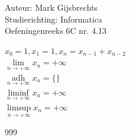 \documentclass[a4paper]{article}
\newcommand{\adh}{\underset{n\rightarrow+\infty}{\operatorname{adh}}}
\begin{document}
\noindent \large Auteur: Mark Gijsbrechts \\
\noindent \large Studierichting: Informatica\\
\noindent \large Oefeningenreeks 6C nr. 4.13\\

\medskip

\normalsize



$ x_{0} = 1 , x_{1} = 1 , x_{n} = x_{n-1} + x_{n-2} $ \\

$ \lim\limits_{n \rightarrow + \infty} x_{n} = + \infty $ \\

$ \adh x_{n} = \{\} $ \\

$ \liminf\limits_{n \rightarrow + \infty} x_{n} = + \infty $ \\

$ \limsup\limits_{n \rightarrow + \infty} x_{n} = + \infty $ \\



\begin{thebibliography}{999}
\end{thebibliography}
\end{document}
